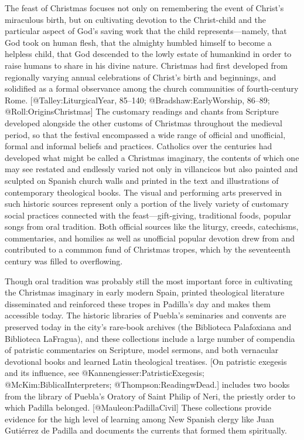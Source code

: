 The feast of Christmas focuses not only on remembering the event of Christ's
miraculous birth, but on cultivating devotion to the Christ-child and the
particular aspect of God's saving work that the child represents---namely, that
God took on human flesh, that the almighty humbled himself to become a helpless
child, that God descended to the lowly estate of humankind in order to raise
humans to share in his divine nature.
Christmas had first developed from regionally varying annual celebrations of
Christ's birth and beginnings, and solidified as a formal observance among the
church communities of fourth-century Rome.
[@Talley:LiturgicalYear, 85--140; @Bradshaw:EarlyWorship, 86--89;
@Roll:OriginsChristmas]
The customary readings and chants from Scripture developed alongside the other
customs of Christmas throughout the medieval period, so that the festival
encompassed a wide range of official and unofficial, formal and informal beliefs
and practices.
Catholics over the centuries had developed what might be called a Christmas
imaginary, the contents of which one may see restated and endlessly varied not
only in villancicos but also painted and sculpted on Spanish church walls and
printed in the text and illustrations of contemporary theological books.
The visual and performing arts preserved in such historic sources represent only
a portion of the lively variety of customary social practices connected with the
feast---gift-giving, traditional foods, popular songs from oral tradition.
Both official sources like the liturgy, creeds, catechisms, commentaries, and
homilies as well as unofficial popular devotion drew from and contributed to a
commmon fund of Christmas tropes, which by the seventeenth century was filled to
overflowing.

Though oral tradition was probably still the most important force in cultivating
the Christmas imaginary in early modern Spain, printed theological literature
disseminated and reinforced these tropes in Padilla's day and makes them
accessible today.
The historic libraries of Puebla's seminaries and convents are preserved today
in the city's rare-book archives (the Biblioteca Palafoxiana and Biblioteca
LaFragua), and these collections include a large number of compendia of
patristic commentaries on Scripture, model sermons, and both vernacular
devotional books and learned Latin theological treatises.
[On patristic exegesis and its influence, see @Kannengiesser:PatristicExegesis;
@McKim:BiblicalInterpreters; @Thompson:ReadingwDead.]
 includes two books from the library of
Puebla's Oratory of Saint Philip of Neri, the priestly order to which Padilla
belonged.
[@Mauleon:PadillaCivil]
These collections provide evidence for the high level of learning among New
Spanish clergy like Juan Gutiérrez de Padilla and documents the currents that
formed them spiritually.

